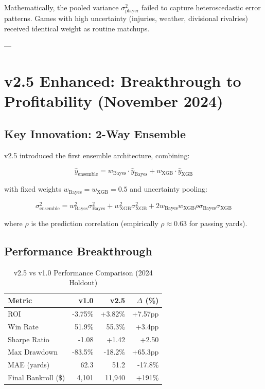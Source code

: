 Mathematically, the pooled variance $\sigma^2_{\text{player}}$ failed to capture heteroscedastic error patterns. Games with high uncertainty (injuries, weather, divisional rivalries) received identical weight as routine matchups.

---

\section{v2.5 Enhanced: Breakthrough to Profitability (November 2024)}

\subsection{Key Innovation: 2-Way Ensemble}

v2.5 introduced the first ensemble architecture, combining:

\begin{equation}
\hat{y}_{\text{ensemble}} = w_{\text{Bayes}} \cdot \hat{y}_{\text{Bayes}} + w_{\text{XGB}} \cdot \hat{y}_{\text{XGB}}
\label{eq:v2-5-ensemble}
\end{equation}

with fixed weights $w_{\text{Bayes}} = w_{\text{XGB}} = 0.5$ and uncertainty pooling:

\begin{equation}
\sigma^2_{\text{ensemble}} = w_{\text{Bayes}}^2 \sigma^2_{\text{Bayes}} + w_{\text{XGB}}^2 \sigma^2_{\text{XGB}} + 2 w_{\text{Bayes}} w_{\text{XGB}} \rho \sigma_{\text{Bayes}} \sigma_{\text{XGB}}
\label{eq:ensemble-variance}
\end{equation}

where $\rho$ is the prediction correlation (empirically $\rho \approx 0.63$ for passing yards).

\subsection{Performance Breakthrough}

\begin{table}[h]
\centering
\caption{v2.5 vs v1.0 Performance Comparison (2024 Holdout)}
\label{tab:v2-5-vs-v1}
\begin{tabular}{lrrr}
\toprule
\textbf{Metric} & \textbf{v1.0} & \textbf{v2.5} & \textbf{$\Delta$ (\%)} \\
\midrule
ROI & -3.75\% & +3.82\% & +7.57pp \\
Win Rate & 51.9\% & 55.3\% & +3.4pp \\
Sharpe Ratio & -1.08 & +1.42 & +2.50 \\
Max Drawdown & -83.5\% & -18.2\% & +65.3pp \\
MAE (yards) & 62.3 & 51.2 & -17.8\% \\
Final Bankroll (\$) & 4,101 & 11,940 & +191\% \\
\bottomrule
\end{tabular}
\end{table}


